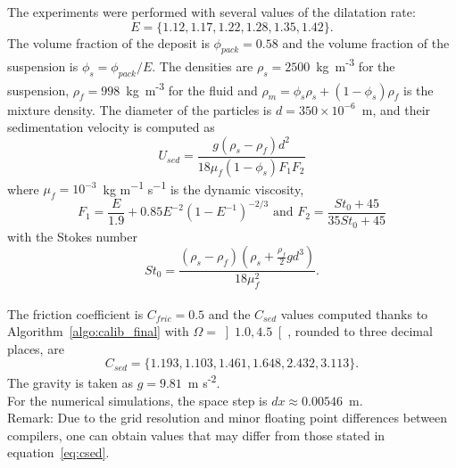  The experiments were performed with several values of the dilatation rate:
 $$E=\{1.12, 1.17, 1.22, 1.28, 1.35, 1.42\}.$$
 The volume fraction of the deposit is $\phi_{pack} = 0.58$ and the volume fraction of the suspension is $\phi_{s}=\phi_{pack}/E$. The densities are $\rho_{s} = 2500$~kg~m\textsuperscript{-3} for the suspension, $\rho_{f} = 998$~kg~m\textsuperscript{-3} for the fluid and $\rho_{m}= \phi_s \rho_s + (1 - \phi_s) \rho_f$ is the mixture density. The diameter of the particles is $d=350\times 10^{-6}$~m,
 and their sedimentation velocity is computed as $$U_{sed} = \frac{g(\rho_s - \rho_f) d^2}{18 \mu_f (1-\phi_s) F_1 F_2}$$
 where $\mu_f = 10^{-3}$~kg m\textsuperscript{−1} s\textsuperscript{−1} is the dynamic viscosity, $$F_1 = \dfrac{E}{1.9} + 0.85 E^{-2} (1-E^{-1})^{-2/3} \mbox{ and }
 F_2 = \dfrac{{St_0}+45}{{35 St_0}+45}$$ with the Stokes number $$St_0 = \dfrac{(\rho_s - \rho_f)(\rho_s + \frac{\rho_f}{2} g d^3)}{18 \mu_f^2}.$$ \\
 The friction coefficient is $C_{fric}=0.5$ and the $C_{sed}$ values computed thanks to Algorithm~\ref{algo:calib_final} with $\Omega = \left] 1.0,4.5 \right[ $, rounded to three decimal places, are
 \begin{equation}
     C_{sed}=\{1.193, 1.103, 1.461, 1.648, 2.432, 3.113\}.
     \label{eq:csed}
\end{equation}
 The gravity is taken as $g=9.81$~m s\textsuperscript{-2}. \\
 For the numerical simulations, the space step is $dx\approx0.00546$~m. \\

Remark: Due to the grid resolution and minor floating point differences between compilers, one can obtain values that may differ from those stated in equation~\eqref{eq:csed}.\\



